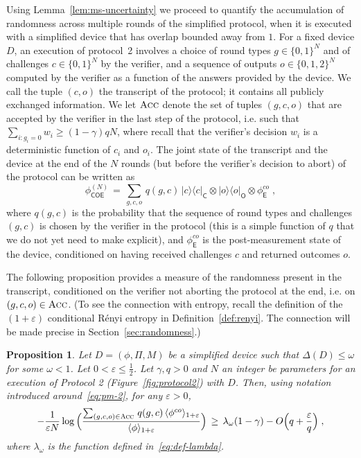 \documentclass[11pt]{article}
\newtheorem{proposition}[theorem]{Proposition}
\theoremstyle{remark}
\theoremstyle{definition}
\newcommand{\ket}[1]{|#1\rangle}
\newcommand{\bra}[1]{\langle#1|}
\newcommand{\proj}[1]{\ket{#1}\!\bra{#1}}
\newcommand{\reg}[1]{{\textsf{#1}}}
\newcommand{\eps}{\varepsilon}
\newcommand{\Acc}{\textsc{Acc}}
\begin{document}
Using Lemma~\ref{lem:ms-uncertainty} we proceed to quantify the accumulation of randomness across multiple rounds of the simplified protocol, when it is executed with a simplified device that has overlap bounded away from $1$. For a fixed device $D$, an execution of protocol~2 involves a choice of round types $g\in\{0,1\}^N$ and of challenges $c\in\{0,1\}^N$ by the verifier, and a sequence of outputs $o\in\{0,1,2\}^N$ computed by the verifier as a function of the answers provided by the device. We call the tuple $(c,o)$ the transcript of the protocol; it contains all publicly exchanged information. We let $\Acc$ denote the set of tuples $(g,c,o)$ that are accepted by the verifier in the last step of the protocol, i.e. such that $\sum_{i: g_i=0} w_i \geq (1-\gamma)qN$, where recall that the verifier's decision $w_i$ is a deterministic function of $c_i$ and $o_i$. The joint state of the transcript and the device at the end of the $N$ rounds (but before the verifier's decision to abort) of the protocol can be written as
\begin{equation}\label{eq:pm-2}
 \phi^{(N)}_{\reg{COE}} \,=\, \sum_{g,c,o}\, q(g,c) \, \proj{c}_\reg{C} \otimes \proj{o}_\reg{O} \otimes \phi_\reg{E}^{co}\;,
\end{equation}
where $q(g,c)$ is the probability that the sequence of round types and challenges $(g,c)$ is chosen by the verifier in the protocol (this is a simple function of $q$ that we do not yet need to make explicit), and $ \phi_\reg{E}^{co}$ is the post-measurement state of the device, conditioned on having received challenges $c$ and returned outcomes $o$. 

The following proposition provides a measure of the randomness present in the transcript, conditioned on the verifier not aborting the protocol at the end, i.e. on $(g,c,o)\in\Acc$. (To see the connection with entropy, recall the definition of the $(1+\eps)$ conditional R\'enyi entropy in Definition~\ref{def:renyi}. The connection will be made precise in Section~\ref{sec:randomness}.)

\begin{proposition}\label{prop:d-rand}
Let $D = (\phi, \Pi, M)$ be a simplified device such that $\Delta(D)\leq \omega$ for some $\omega < 1$. Let $0<\eps \leq \frac{1}{2}$.  Let $\gamma,q>0$ and $N$ an integer be parameters for an execution of Protocol 2 (Figure~\ref{fig:protocol2}) with $D$. Then, using notation introduced around~\eqref{eq:pm-2}, for any $\eps>0$,
\begin{equation}\label{eq:d-rand-0}
- \frac{1}{\eps N} \log \Big( \frac{ \sum_{(g,c,o) \in \Acc} \,q(g,c)\, \langle \phi^{co} \rangle_{1+\eps}}{\langle \phi \rangle_{1+\eps} }\Big) \,\geq\,  \lambda_\omega(1-\gamma) - O\Big(q+\frac{\eps}{q}\Big)\;,
\end{equation}
where  $\lambda_\omega$ is the function defined in~\eqref{eq:def-lambda}.
\end{proposition}
\end{document}
